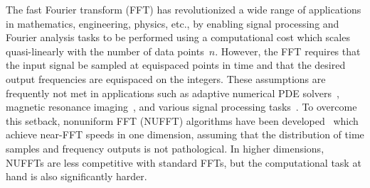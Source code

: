 
The fast Fourier transform (FFT) has revolutionized a wide range of applications
in mathematics, engineering, physics, etc., by enabling signal processing and
Fourier analysis tasks to be performed using a computational cost which scales
quasi-linearly with the number of data points~$n$. However, the FFT requires
that the input signal be sampled at equispaced points in time and that the
desired output frequencies are equispaced on the integers. These assumptions are
frequently not met in applications such as adaptive numerical PDE
solvers~\cite{alpert2002adaptive,jiang2023dual,askham2017adaptive,nochetto2009theory},
magnetic resonance
imaging~\cite{greengard2007fast,bondesson2019nonuniform,bronstein2002reconstruction},
and various signal processing
tasks~\cite{alexander2012adaptive,thakur2011synchrosqueezing}. To overcome this
setback, nonuniform FFT (NUFFT) algorithms have been
developed~\cite{dutt1993fast,greengard2004accelerating} which achieve near-FFT
speeds in one dimension, assuming that the distribution of time samples and
frequency outputs is not pathological. In higher dimensions, NUFFTs are less
competitive with standard FFTs, but the computational task at hand is also
significantly harder.

